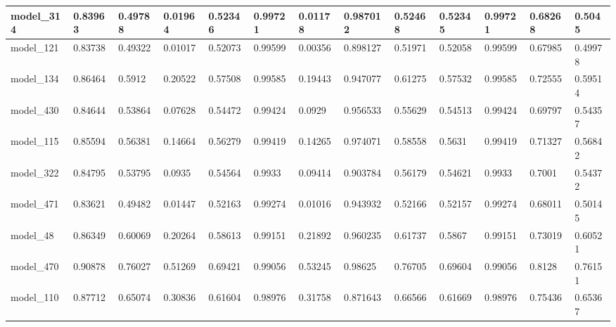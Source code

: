\begin{tabular}{|l|l|l|l|l|l|l|l|l|l|l|l|l|}
model\_314     & 0.83963     & 0.49788        & 0.01964      & 0.52346          & 0.99721              & 0.01178              & 0.987012     & 0.52468           & 0.52345            & 0.99721         & 0.68268     & 0.5045       \\ \hline
model\_121     & 0.83738     & 0.49322        & 0.01017      & 0.52073          & 0.99599              & 0.00356              & 0.898127     & 0.51971           & 0.52058            & 0.99599         & 0.67985     & 0.49978      \\ \hline
model\_134     & 0.86464     & 0.5912         & 0.20522      & 0.57508          & 0.99585              & 0.19443              & 0.947077     & 0.61275           & 0.57532            & 0.99585         & 0.72555     & 0.59514      \\ \hline
model\_430     & 0.84644     & 0.53864        & 0.07628      & 0.54472          & 0.99424              & 0.0929               & 0.956533     & 0.55629           & 0.54513            & 0.99424         & 0.69797     & 0.54357      \\ \hline
model\_115     & 0.85594     & 0.56381        & 0.14664      & 0.56279          & 0.99419              & 0.14265              & 0.974071     & 0.58558           & 0.5631             & 0.99419         & 0.71327     & 0.56842      \\ \hline
model\_322     & 0.84795     & 0.53795        & 0.0935       & 0.54564          & 0.9933               & 0.09414              & 0.903784     & 0.56179           & 0.54621            & 0.9933          & 0.7001      & 0.54372      \\ \hline
model\_471     & 0.83621     & 0.49482        & 0.01447      & 0.52163          & 0.99274              & 0.01016              & 0.943932     & 0.52166           & 0.52157            & 0.99274         & 0.68011     & 0.50145      \\ \hline
model\_48      & 0.86349     & 0.60069        & 0.20264      & 0.58613          & 0.99151              & 0.21892              & 0.960235     & 0.61737           & 0.5867             & 0.99151         & 0.73019     & 0.60521      \\ \hline
model\_470     & 0.90878     & 0.76027        & 0.51269      & 0.69421          & 0.99056              & 0.53245              & 0.98625      & 0.76705           & 0.69604            & 0.99056         & 0.8128      & 0.76151      \\ \hline
model\_110     & 0.87712     & 0.65074        & 0.30836      & 0.61604          & 0.98976              & 0.31758              & 0.871643     & 0.66566           & 0.61669            & 0.98976         & 0.75436     & 0.65367      \\ \hline

\end{tabular}
